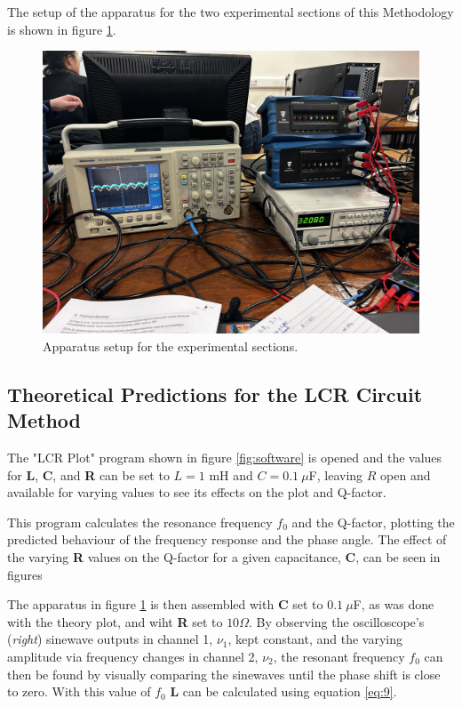 \documentclass[12pt]{article}
\begin{document}
The setup of the apparatus for the two experimental sections of this Methodology is shown in figure \ref{fig:setup}.

\begin{figure}[H]
    \centering
    \includegraphics[width=15cm]{own exp equip.jpeg}
    \caption{\centering \footnotesize{Apparatus setup for the experimental sections.}}
    \label{fig:setup}
\end{figure}

\subsection{Theoretical Predictions for the LCR Circuit Method} \label{sec:2.1}

The "LCR Plot" program shown in figure \ref{fig:software} is opened and the values for \textbf{L}, \textbf{C}, and \textbf{R} can be set to $L=1$ mH and $C=0.1 \: \mu$F, leaving $R$ open and available
for varying values to see its effects on the plot and Q-factor.

This program calculates the resonance frequency $f_0$ and the Q-factor, plotting the predicted behaviour of the frequency response and the phase angle.
The effect of the varying \textbf{R} values on the Q-factor for a given capacitance, \textbf{C}, can be seen in figures 

The apparatus in figure \ref{fig:setup} is then assembled with \textbf{C} set to $0.1 \: \mu$F, as was done with the theory plot, and wiht \textbf{R} set to $10 \Omega$.
By observing the oscilloscope's (\textit{right}) sinewave outputs in channel 1, $\nu_1$, kept constant, and the varying amplitude via frequency changes in channel 2, $\nu_2$, the resonant frequency $f_0$
can then be found by visually comparing the sinewaves until the phase shift is close to zero. With this value of $f_0$ \textbf{L} can be calculated using equation \ref{eq:9}.
\end{document}
